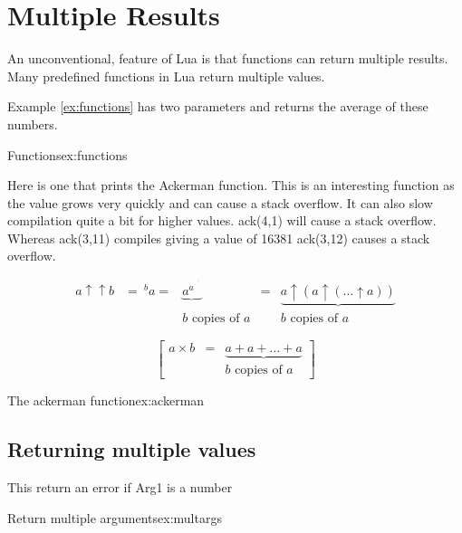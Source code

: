 \section{Multiple Results}

An unconventional, feature of Lua is that functions can return multiple results. Many predefined functions in Lua return multiple values. 

Example \ref{ex:functions} has two parameters and returns the average of these numbers.

\begin{texexample}{Functions}{ex:functions}
\end{texexample}

Here is one that prints the Ackerman function. This is an interesting function as the value grows very quickly and can cause a stack overflow. It can also slow compilation quite a bit for higher values. ack(4,1) will cause a stack overflow. Whereas ack(3,11) compiles giving a value of 16381 ack(3,12) causes a stack overflow.  

\[
\begin{matrix}
   a\uparrow\uparrow b & = {\ ^{b}a}  = & \underbrace{a^{a^{{}^{.\,^{.\,^{.\,^a}}}}}} & 
   = & \underbrace{a\uparrow (a\uparrow(\dots\uparrow a))} 
\\  
    & & b\mbox{ copies of }a
    & & b\mbox{ copies of }a
  \end{matrix}
\]

\[
\begin{bmatrix}
   a\times b & = & \underbrace{a+a+\dots+a} \\
   & & b\mbox{ copies of }a
\end{bmatrix} 
\]


\begin{texexample}{The ackerman function}{ex:ackerman}
\end{texexample}


\subsection{Returning multiple values}

This return an error if Arg1 is a number

\begin{texexample}{Return multiple arguments}{ex:multargs}
\end{texexample}


